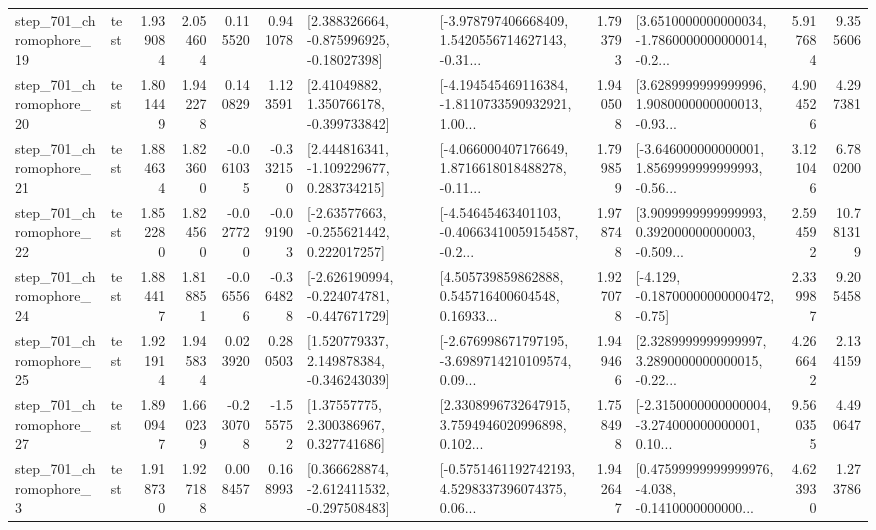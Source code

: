 \begin{tabular}{llrrrrllrlrr}
  step\_701\_chromophore\_19 &      test &      1.939084 &    2.054604 &      0.115520 &  0.941078 &    [2.388326664, -0.875996925, -0.18027398] &  [-3.978797406668409, 1.5420556714627143, -0.31... &       1.793793 &  [3.6510000000000034, -1.7860000000000014, -0.2... &            5.917684 &          9.355606 \\
  step\_701\_chromophore\_20 &      test &      1.801449 &    1.942278 &      0.140829 &  1.123591 &     [2.41049882, 1.350766178, -0.399733842] &  [-4.194545469116384, -1.8110733590932921, 1.00... &       1.940508 &  [3.6289999999999996, 1.9080000000000013, -0.93... &            4.904526 &          4.297381 \\
  step\_701\_chromophore\_21 &      test &      1.884634 &    1.823600 &     -0.061035 & -0.332150 &    [2.444816341, -1.109229677, 0.283734215] &  [-4.066000407176649, 1.8716618018488278, -0.11... &       1.799859 &  [-3.646000000000001, 1.8569999999999993, -0.56... &            3.121046 &          6.780200 \\
  step\_701\_chromophore\_22 &      test &      1.852280 &    1.824560 &     -0.027720 & -0.091903 &    [-2.63577663, -0.255621442, 0.222017257] &  [-4.54645463401103, -0.40663410059154587, -0.2... &       1.978748 &  [3.9099999999999993, 0.392000000000003, -0.509... &            2.594592 &         10.781319 \\
  step\_701\_chromophore\_24 &      test &      1.884417 &    1.818851 &     -0.065566 & -0.364828 &  [-2.626190994, -0.224074781, -0.447671729] &  [4.505739859862888, 0.545716400604548, 0.16933... &       1.927078 &              [-4.129, -0.18700000000000472, -0.75] &            2.339987 &          9.205458 \\
  step\_701\_chromophore\_25 &      test &      1.921914 &    1.945834 &      0.023920 &  0.280503 &    [1.520779337, 2.149878384, -0.346243039] &  [-2.676998671797195, -3.6989714210109574, 0.09... &       1.949466 &  [2.3289999999999997, 3.2890000000000015, -0.22... &            4.266642 &          2.134159 \\
  step\_701\_chromophore\_27 &      test &      1.890947 &    1.660239 &     -0.230708 & -1.555752 &      [1.37557775, 2.300386967, 0.327741686] &  [2.3308996732647915, 3.7594946020996898, 0.102... &       1.758498 &  [-2.3150000000000004, -3.274000000000001, 0.10... &            9.560355 &          4.490647 \\
   step\_701\_chromophore\_3 &      test &      1.918730 &    1.927188 &      0.008457 &  0.168993 &   [0.366628874, -2.612411532, -0.297508483] &  [-0.5751461192742193, 4.5298337396074375, 0.06... &       1.942647 &  [0.47599999999999976, -4.038, -0.1410000000000... &            4.623930 &          1.273786 \\

\end{tabular}
